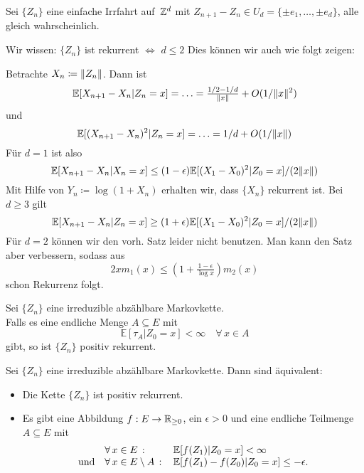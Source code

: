 \documentclass{cheat-sheet}
\newcommand{\E}{\mathbb{E}} %
\begin{document}
\begin{bsp}
  Sei $\{ Z_n \}$ eine einfache Irrfahrt auf~$\mathbb{Z}^d$ mit
  $Z_{n+1} - Z_n \in U_d = \{ \pm e_1, \ldots, \pm e_d \}$, alle gleich wahrscheinlich.

  Wir wissen: $\{ Z_n \}$ ist rekurrent $\iff$ $d \leq 2$
  Dies können wir auch wie folgt zeigen:

  Betrachte $X_n \coloneqq \lVert Z_n\rVert$.
  Dann ist
  \[ \E[ X_{n+1} - X_n | Z_n = x ] = \ldots = \tfrac{1/2 - 1/d}{\norm{x}} + O(1 / \norm{x}^2) \]
  und
  \[ \E[ (X_{n+1} - X_n)^2 | Z_n = x ] = \ldots = 1/d + O(1 / \norm{x}) \]
  Für $d = 1$ ist also
  \[ \E[ X_{n+1} - X_n | X_n = x ] \leq (1-\epsilon) \E[ (X_1 - X_0)^2 | Z_0 = x ] / (2 \norm{x}) \]
  Mit Hilfe von $Y_n \coloneqq \log(1 + X_n)$ erhalten wir, dass $\{ X_n \}$ rekurrent ist.
  Bei $d \geq 3$ gilt
  \[ \E[ X_{n+1} - X_n | Z_n = x ] \geq (1+\epsilon) \E[ (X_1 - X_0)^2 | Z_0 = x ] / (2 \norm{x}) \]
  Für $d = 2$ können wir den vorh. Satz leider nicht benutzen.
  Man kann den Satz aber verbessern, sodass aus
  \[ 2 x m_1(x) \leq (1 + \tfrac{1-\epsilon}{\log x}) m_2(x) \]
  schon Rekurrenz folgt.
\end{bsp}


\begin{lem}
  Sei $\{ Z_n \}$ eine irreduzible abzählbare Markovkette. \\
  Falls es eine endliche Menge $A \subseteq E$ mit
  \[
    \E[ \tau_A | Z_0 = x ] < \infty
    \quad \forall\, x \in A
  \]
  gibt, so ist $\{ Z_n \}$ positiv rekurrent.
\end{lem}

\begin{satz}
  Sei $\{ Z_n \}$ eine irreduzible abzählbare Markovkette.
  Dann sind äquivalent:
  \begin{itemize}
    \item Die Kette $\{ Z_n \}$ ist positiv rekurrent.
    \item Es gibt eine Abbildung $f : E \to \mathbb{R}_{\geq 0}$, ein $\epsilon > 0$ und eine endliche Teilmenge $A \subseteq E$ mit
    \[
      \begin{array}{r l l}
        & \fa{x \in E} & \E[ f(Z_1) | Z_0 = x ] < \infty \\
        \text{und} & \fa{x \in E \setminus A} & \E[ f(Z_1) - f(Z_0) | Z_0 = x ] \leq - \epsilon.
      \end{array}
    \]
  \end{itemize}
\end{satz}
\end{document}
